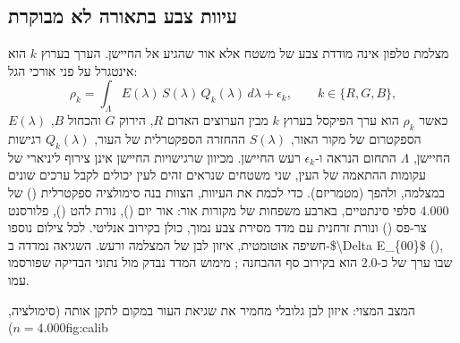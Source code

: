 \subsection{עיוות צבע בתאורה לא מבוקרת}
מצלמת טלפון אינה מודדת צבע של משטח אלא אור שהגיע אל החיישן. הערך בערוץ $k$ הוא אינטגרל על פני אורכי הגל:
\begin{equation}
\rho_k = \int_{\Lambda} E(\lambda)\, S(\lambda)\, Q_k(\lambda)\, d\lambda + \epsilon_k, \qquad k \in \{R, G, B\},
\label{eq:formation}
\end{equation}
כאשר $\rho_k$ הוא ערך הפיקסל בערוץ $k$ מבין הערוצים האדום $R$, הירוק $G$ והכחול $B$, $E(\lambda)$ הספקטרום של מקור האור, $S(\lambda)$ ההחזרה הספקטרלית של העור, $Q_k(\lambda)$ רגישות החיישן, $\Lambda$ התחום הנראה ו-$\epsilon_k$ רעש החיישן. מכיוון שרגישויות החיישן אינן צירוף ליניארי של עקומות ההתאמה של העין, שני משטחים שנראים זהים לעין יכולים לקבל ערכים שונים במצלמה, ולהפך (מטמריזם). כדי לכמת את העיוות, הצוות בנה סימולציה ספקטרלית () של \num{4,000} סלפי סינתטיים, בארבע משפחות של מקורות אור: אור יום (), נורת להט (), פלורסנט צר-פס () ונורת  זרחנית עם מדד מסירת צבע נמוך, כולן בקירוב אנליטי. לכל צילום נוספו חשיפה אוטומטית, איזון לבן של המצלמה ורעש. השגיאה נמדדה ב-\num{$\Delta E_{00}$} (), שבו ערך של כ-\num{2.0} הוא בקירוב סף ההבחנה \cite{sharma2005ciede2000}; מימוש המדד נבדק מול נתוני הבדיקה שפורסמו עמו.

\begin{reportfigure}{המצב המצוי: איזון לבן גלובלי מחמיר את שגיאת העור במקום לתקן אותה (סימולציה, $n=\num{4,000}$)}{fig:calib}
\end{reportfigure}

